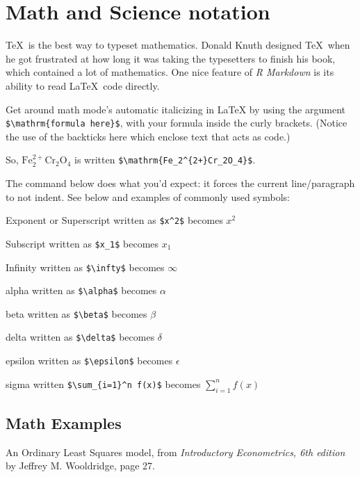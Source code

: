 \documentclass[12pt,oneside]{chicagocapstone}
\begin{document}
\section*{Math and Science notation}\label{math-sci}

\TeX~is the best way to typeset mathematics. Donald Knuth designed
\TeX~when he got frustrated at how long it was taking the typesetters to
finish his book, which contained a lot of mathematics. One nice feature
of \emph{R Markdown} is its ability to read \LaTeX~code directly.

Get around math mode's automatic italicizing in LaTeX by using the
argument \texttt{\$\textbackslash{}mathrm\{formula\ here\}\$}, with your
formula inside the curly brackets. (Notice the use of the backticks here
which enclose text that acts as code.)

So, \(\mathrm{Fe_2^{2+}Cr_2O_4}\) is written
\texttt{\$\textbackslash{}mathrm\{Fe\_2\^{}\{2+\}Cr\_2O\_4\}\$}.

The \noindent command below does what you'd expect: it forces the
current line/paragraph to not indent. See below and examples of commonly
used symbols:

\noindent Exponent or Superscript written as \texttt{\$x\^{}2\$} becomes
\(x^2\)

\noindent Subscript written as \texttt{\$x\_1\$} becomes \(x_1\)

\noindent Infinity written as \texttt{\$\textbackslash{}infty\$} becomes
\(\infty\)

\noindent alpha written as \texttt{\$\textbackslash{}alpha\$} becomes
\(\alpha\)

\noindent beta written as \texttt{\$\textbackslash{}beta\$} becomes
\(\beta\)

\noindent delta written as \texttt{\$\textbackslash{}delta\$} becomes
\(\delta\)

\noindent epsilon written as \texttt{\$\textbackslash{}epsilon\$}
becomes \(\epsilon\)

\noindent sigma written
\texttt{\$\textbackslash{}sum\_\{i=1\}\^{}n\ f(x)\$} becomes
\(\sum_{i=1}^n f(x)\)

\subsection*{Math Examples}\label{math-examples}

An Ordinary Least Squares model, from \emph{Introductory Econometrics,
6th edition} by Jeffrey M. Wooldridge, page 27.
\end{document}
